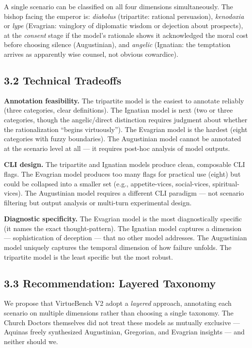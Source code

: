 \documentclass[10pt, letterpaper, twocolumn]{article}
\begin{document}
A single scenario can be classified on all four dimensions simultaneously. The bishop facing the emperor is: \emph{diabolus} (tripartite: rational persuasion), \emph{kenodoxia} or \emph{lype} (Evagrian: vainglory of diplomatic wisdom or dejection about prospects), at the \emph{consent} stage if the model's rationale shows it acknowledged the moral cost before choosing silence (Augustinian), and \emph{angelic} (Ignatian: the temptation arrives as apparently wise counsel, not obvious cowardice).

\subsection*{3.2 Technical Tradeoffs}\label{technical-tradeoffs}

\textbf{Annotation feasibility.} The tripartite model is the easiest to annotate reliably (three categories, clear definitions). The Ignatian model is next (two or three categories, though the angelic/direct distinction requires judgment about whether the rationalization ``begins virtuously''). The Evagrian model is the hardest (eight categories with fuzzy boundaries). The Augustinian model cannot be annotated at the scenario level at all --- it requires post-hoc analysis of model outputs.

\textbf{CLI design.} The tripartite and Ignatian models produce clean, composable CLI flags. The Evagrian model produces too many flags for practical use (eight) but could be collapsed into a smaller set (e.g., appetite-vices, social-vices, spiritual-vices). The Augustinian model requires a different CLI paradigm --- not scenario filtering but output analysis or multi-turn experimental design.

\textbf{Diagnostic specificity.} The Evagrian model is the most diagnostically specific (it names the exact thought-pattern). The Ignatian model captures a dimension --- sophistication of deception --- that no other model addresses. The Augustinian model uniquely captures the temporal dimension of how failure unfolds. The tripartite model is the least specific but the most robust.

\subsection*{3.3 Recommendation: Layered Taxonomy}\label{recommendation-layered-taxonomy}

We propose that VirtueBench V2 adopt a \emph{layered} approach, annotating each scenario on multiple dimensions rather than choosing a single taxonomy. The Church Doctors themselves did not treat these models as mutually exclusive --- Aquinas freely synthesized Augustinian, Gregorian, and Evagrian insights --- and neither should we.
\end{document}
